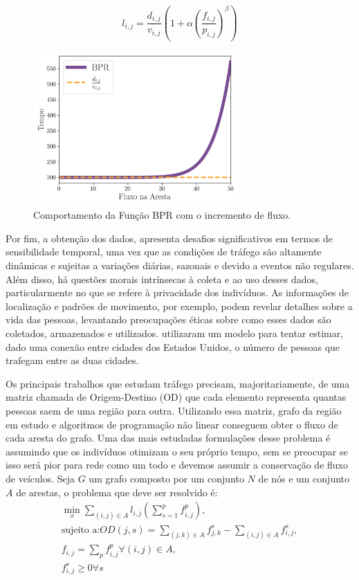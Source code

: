 \documentclass{article}
\begin{document}
\begin{equation}
    l_{i,j} = \frac{d_{i,j}}{v_{i,j}}\left(1 + \alpha\left(\frac{f_{i,j}}{p_{i,j}}\right)^{\beta} \right)
    \label{eq:BPR}
\end{equation}

\begin{figure}[H]
    \centering
    \includegraphics[width=0.7\textwidth]{img/BPR.png}
    \caption{Comportamento da Função BPR com o incremento de fluxo.}
    \label{fig:BPR}
\end{figure}


Por fim, a obtenção dos dados, apresenta desafios significativos em termos de sensibilidade temporal, uma vez que as condições de tráfego são altamente dinâmicas e sujeitas a variações diárias, sazonais e devido a eventos não regulares. Além disso, há questões morais intrínsecas à coleta e ao uso desses dados, particularmente no que se refere à privacidade dos indivíduos. As informações de localização e padrões de movimento, por exemplo, podem revelar detalhes sobre a vida das pessoas, levantando preocupações éticas sobre como esses dados são coletados, armazenados e utilizados. \citet{Simini2012} utilizaram um modelo para tentar estimar, dado uma conexão entre cidades dos Estados Unidos, o número de pessoas que trafegam entre as duas cidades.

Os principais trabalhos que estudam tráfego precisam, majoritariamente, de uma matriz chamada de Origem-Destino (OD) que cada elemento representa quantas pessoas saem de uma região para outra. Utilizando essa matriz, grafo da região em estudo e algoritmos de programação não linear \cite{LeBlanc1975} conseguem obter o fluxo de cada aresta do grafo. Uma das mais estudadas formulações desse problema é assumindo que os indivíduos otimizam o seu próprio tempo, sem se preocupar se isso será pior para rede como um todo e devemos assumir a conservação de fluxo de veículos. Seja $G$ um grafo composto por um conjunto $N$ de nós e um conjunto $A$ de arestas, o problema que deve ser resolvido é:
\   
\begin{align}
    \min_{x} \sum_{(i,j) \in A} l_{i,j}\left(\sum_{s = 1}^{p}f^p_{i,j}\right),\\
    \text{sujeito a:} OD(j,s) = \sum_{(j,k) \in A}f^s_{j,k} - \sum_{(i,j) \in A}f^s_{i,j},\\
    f_{i,j} = \sum_{p}f^p_{i,j} \forall (i,j) \in A ,\\
    f^s_{i,j} \geq 0 \forall s\\
\end{align}
\end{document}
